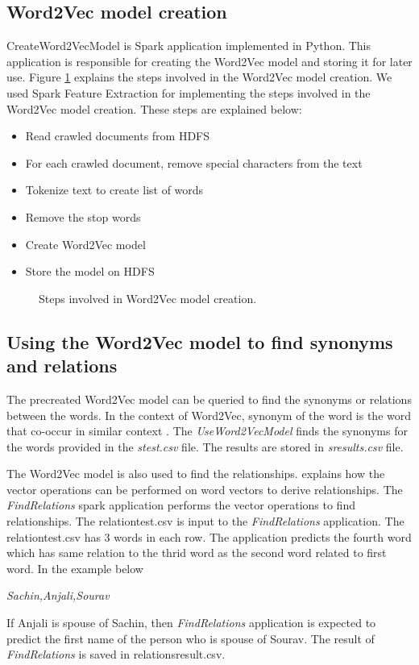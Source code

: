 \subsection{Word2Vec model creation} \label{createmodelsection}
CreateWord2VecModel is Spark application implemented in Python. This
application is responsible for creating the Word2Vec model and storing it for
 later use. Figure \ref{fig:word2vecmodelflow} explains the steps involved in
  the Word2Vec model creation. We used Spark Feature Extraction
  \cite{www-sparkml-features} for implementing the steps involved in the
  Word2Vec model creation. These steps are explained below:
  \begin{itemize}
  \item Read crawled documents from HDFS
  \item For each crawled document, remove special characters from the text
  \item Tokenize text to create list of words
  \item Remove the stop words
  \item Create Word2Vec model
  \item Store the model on HDFS
  \end{itemize}

\begin{figure}[htbp]
\centering
{}
\caption{Steps involved in Word2Vec model creation.}
\label{fig:word2vecmodelflow}
\end{figure}

\subsection{Using the Word2Vec model to find synonyms and relations}
\label{usemodel}

The precreated Word2Vec model can be queried to find the synonyms or
relations between the words. In the context of Word2Vec, synonym of the word
is the word that co-occur in similar context \cite{Goldberg2014word2vecED}.
The \textit{UseWord2VecModel} finds the synonyms for the words provided in
 the
\textit{stest.csv} file. The results are stored in \textit{sresults.csv} file.

The Word2Vec model is also used to find the relationships.
\cite{www-tensorflow} explains how the vector operations can be performed on
word vectors to derive relationships. The \textit{FindRelations} spark
application
performs the vector operations to find relationships. The relationtest.csv is
 input to the \textit{FindRelations} application. The relationtest.csv has 3
  words in
  each row. The application predicts the fourth word which has same relation to
  the thrid word as the second word related to first word. In the example below

   \textit{Sachin,Anjali,Sourav}

If Anjali is spouse of Sachin, then \textit{FindRelations} application is
expected to
 predict the first name of the person who is spouse of Sourav.
  The result of \textit{FindRelations} is saved in relationsresult.csv.



